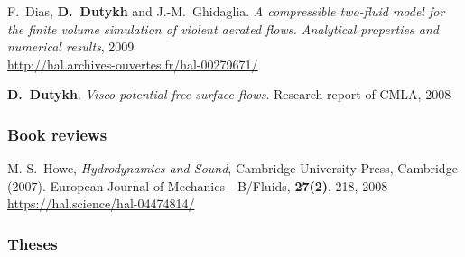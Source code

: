 \documentclass[final, a4paper, oneside, 12pt]{article}
\numberwithin{equation}{section}
\begin{document}
\begin{etaremune}

  
  \item F.~Dias, \textbf{D.~Dutykh} and J.-M.~Ghidaglia. \textit{A compressible two-fluid model for the finite volume simulation of violent aerated flows. Analytical properties and numerical results}, 2009 \\ %
  \url{http://hal.archives-ouvertes.fr/hal-00279671/}
  

  
  \item \textbf{D.~Dutykh}. \textit{Visco-potential free-surface flows}. Research report of CMLA, 2008 %
  
\end{etaremune}

\subsubsection{Book reviews}

\begin{etaremune}

  \item M. S.~Howe, \textit{Hydrodynamics and Sound}, Cambridge University Press, Cambridge (2007). European Journal of Mechanics - B/Fluids, \textbf{27(2)}, 218, 2008 \\ %
  \url{https://hal.science/hal-04474814/}
  
\end{etaremune}

\subsubsection{Theses}
\end{document}
